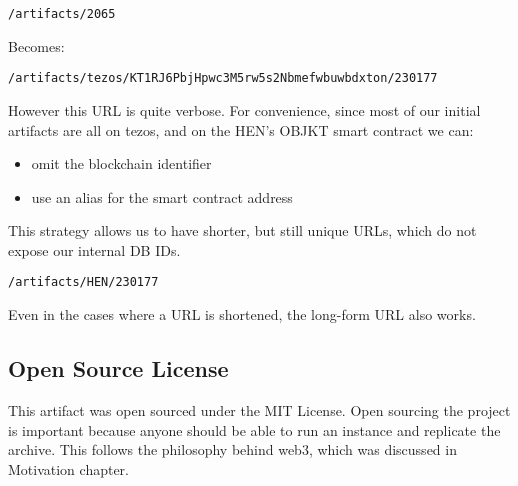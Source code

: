 \texttt{/artifacts/2065}

Becomes:

\texttt{/artifacts/tezos/KT1RJ6PbjHpwc3M5rw5s2Nbmefwbuwbdxton/230177}


However this URL is quite verbose. For convenience, since most of our initial artifacts are all on tezos, and on the HEN's OBJKT smart contract we can:

\begin{itemize}
    \item omit the blockchain identifier
    \item use an alias for the smart contract address
\end{itemize}

This strategy allows us to have shorter, but still unique URLs, which do not expose our internal DB IDs.

\texttt{/artifacts/HEN/230177}

Even in the cases where a URL is shortened, the long-form URL also works.


\subsection{Open Source License}

This artifact was open sourced under the MIT License.
Open sourcing the project is important because anyone should be able to run an instance and replicate the archive. This follows the philosophy behind web3, which was discussed in Motivation chapter.
















